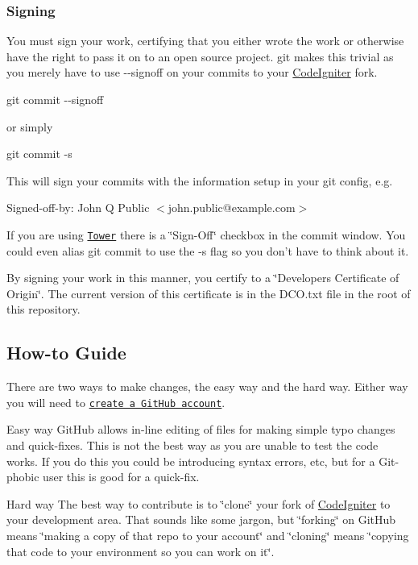 \subsubsection*{Signing}

You must sign your work, certifying that you either wrote the work or otherwise have the right to pass it on to an open source project. git makes this trivial as you merely have to use {\ttfamily -\/-\/signoff} on your commits to your \mbox{\hyperlink{namespace_code_igniter}{Code\+Igniter}} fork.

{\ttfamily git commit -\/-\/signoff}

or simply

{\ttfamily git commit -\/s}

This will sign your commits with the information setup in your git config, e.\+g.

{\ttfamily Signed-\/off-\/by\+: John Q Public $<$john.\+public@example.\+com$>$}

If you are using \href{http://www.git-tower.com/}{\tt Tower} there is a \char`\"{}\+Sign-\/\+Off\char`\"{} checkbox in the commit window. You could even alias git commit to use the {\ttfamily -\/s} flag so you don’t have to think about it.

By signing your work in this manner, you certify to a \char`\"{}\+Developer\textquotesingle{}s Certificate of Origin\char`\"{}. The current version of this certificate is in the {\ttfamily D\+C\+O.\+txt} file in the root of this repository.

\subsection*{How-\/to Guide}

There are two ways to make changes, the easy way and the hard way. Either way you will need to \href{https://github.com/signup/free}{\tt create a Git\+Hub account}.

Easy way Git\+Hub allows in-\/line editing of files for making simple typo changes and quick-\/fixes. This is not the best way as you are unable to test the code works. If you do this you could be introducing syntax errors, etc, but for a Git-\/phobic user this is good for a quick-\/fix.

Hard way The best way to contribute is to \char`\"{}clone\char`\"{} your fork of \mbox{\hyperlink{namespace_code_igniter}{Code\+Igniter}} to your development area. That sounds like some jargon, but \char`\"{}forking\char`\"{} on Git\+Hub means \char`\"{}making a copy of that repo to your account\char`\"{} and \char`\"{}cloning\char`\"{} means \char`\"{}copying that code to your environment so you can work on it\char`\"{}.


